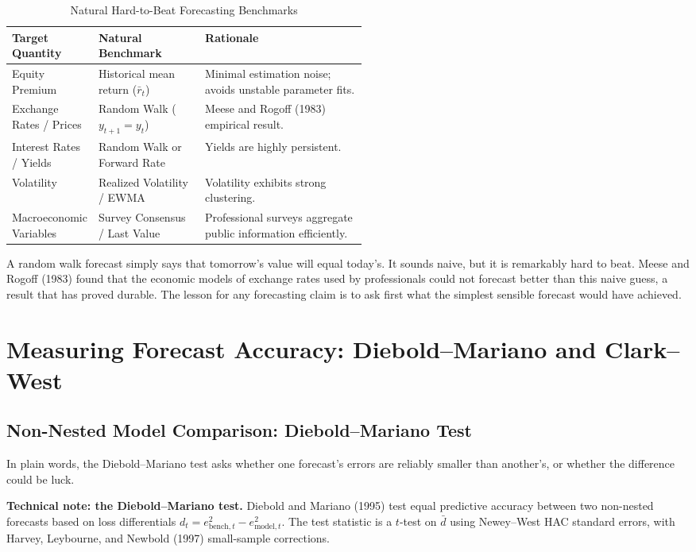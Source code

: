 \begin{table}[htbp]
\centering
\small
\caption{Natural Hard-to-Beat Forecasting Benchmarks}
\label{tab:09-benchmarks}
\begin{tabularx}{0.95\linewidth}{@{}>{\raggedright\arraybackslash}p{0.22\linewidth}>{\raggedright\arraybackslash}p{0.30\linewidth}>{\raggedright\arraybackslash}X@{}}
\toprule
Target Quantity & Natural Benchmark & Rationale \\
\midrule
Equity Premium & Historical mean return ($\bar{r}_t$) & Minimal estimation noise; avoids unstable parameter fits. \\
Exchange Rates / Prices & Random Walk ($y_{t+1} = y_t$) & Meese and Rogoff (1983) empirical result. \\
Interest Rates / Yields & Random Walk or Forward Rate & Yields are highly persistent. \\
Volatility & Realized Volatility / EWMA & Volatility exhibits strong clustering. \\
Macroeconomic Variables & Survey Consensus / Last Value & Professional surveys aggregate public information efficiently. \\
\bottomrule
\end{tabularx}
\end{table}

A random walk forecast simply says that tomorrow's value will equal today's. It sounds naive, but it is remarkably hard to beat. Meese and Rogoff (1983) found that the economic models of exchange rates used by professionals could not forecast better than this naive guess, a result that has proved durable. The lesson for any forecasting claim is to ask first what the simplest sensible forecast would have achieved.

\section{Measuring Forecast Accuracy: Diebold--Mariano and Clark--West}
\label{sec:09-accuracy}

\subsection{Non-Nested Model Comparison: Diebold--Mariano Test}
In plain words, the Diebold--Mariano test asks whether one forecast's errors are reliably smaller than another's, or whether the difference could be luck.

\begin{technote}
\textbf{Technical note: the Diebold--Mariano test.} Diebold and Mariano (1995) test equal predictive accuracy between two non-nested forecasts based on loss differentials $d_t = e^2_{\text{bench},t} - e^2_{\text{model},t}$. The test statistic is a $t$-test on $\bar{d}$ using Newey--West HAC standard errors, with Harvey, Leybourne, and Newbold (1997) small-sample corrections.
\end{technote}

